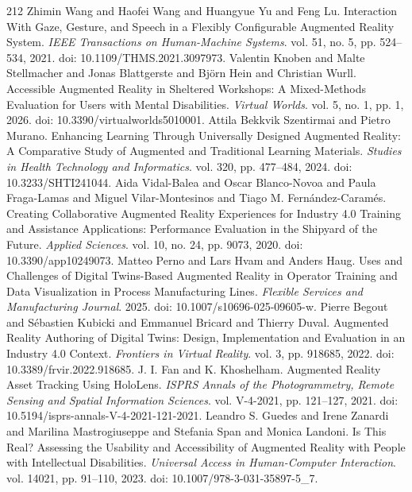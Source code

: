 \begin{thebibliography}{212}
 Zhimin Wang and Haofei Wang and Huangyue Yu and Feng Lu. Interaction With Gaze, Gesture, and Speech in a Flexibly Configurable Augmented Reality System. \emph{IEEE Transactions on Human-Machine Systems}. vol. 51, no. 5, pp. 524--534, 2021. doi: 10.1109/THMS.2021.3097973.
 Valentin Knoben and Malte Stellmacher and Jonas Blattgerste and Bj{\"o}rn Hein and Christian Wurll. Accessible Augmented Reality in Sheltered Workshops: A Mixed-Methods Evaluation for Users with Mental Disabilities. \emph{Virtual Worlds}. vol. 5, no. 1, pp. 1, 2026. doi: 10.3390/virtualworlds5010001.
 Attila Bekkvik Szentirmai and Pietro Murano. Enhancing Learning Through Universally Designed Augmented Reality: A Comparative Study of Augmented and Traditional Learning Materials. \emph{Studies in Health Technology and Informatics}. vol. 320, pp. 477--484, 2024. doi: 10.3233/SHTI241044.
 Aida Vidal-Balea and Oscar Blanco-Novoa and Paula Fraga-Lamas and Miguel Vilar-Montesinos and Tiago M. Fern{\'a}ndez-Caram{\'e}s. Creating Collaborative Augmented Reality Experiences for Industry 4.0 Training and Assistance Applications: Performance Evaluation in the Shipyard of the Future. \emph{Applied Sciences}. vol. 10, no. 24, pp. 9073, 2020. doi: 10.3390/app10249073.
 Matteo Perno and Lars Hvam and Anders Haug. Uses and Challenges of Digital Twins-Based Augmented Reality in Operator Training and Data Visualization in Process Manufacturing Lines. \emph{Flexible Services and Manufacturing Journal}. 2025. doi: 10.1007/s10696-025-09605-w.
 Pierre Begout and S{\'e}bastien Kubicki and Emmanuel Bricard and Thierry Duval. Augmented Reality Authoring of Digital Twins: Design, Implementation and Evaluation in an Industry 4.0 Context. \emph{Frontiers in Virtual Reality}. vol. 3, pp. 918685, 2022. doi: 10.3389/frvir.2022.918685.
 J. I. Fan and K. Khoshelham. Augmented Reality Asset Tracking Using HoloLens. \emph{ISPRS Annals of the Photogrammetry, Remote Sensing and Spatial Information Sciences}. vol. V-4-2021, pp. 121--127, 2021. doi: 10.5194/isprs-annals-V-4-2021-121-2021.
 Leandro S. Guedes and Irene Zanardi and Marilina Mastrogiuseppe and Stefania Span and Monica Landoni. Is This Real? Assessing the Usability and Accessibility of Augmented Reality with People with Intellectual Disabilities. \emph{Universal Access in Human-Computer Interaction}. vol. 14021, pp. 91--110, 2023. doi: 10.1007/978-3-031-35897-5_7.

\end{thebibliography}
